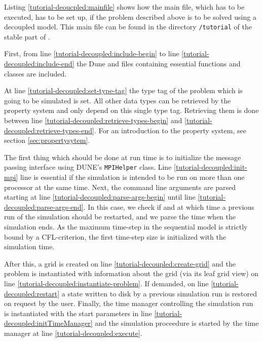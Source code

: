 Listing \ref{tutorial-deoucpled:mainfile} shows how the main file, which has to be executed, has to be set up, if the problem described above is to be solved using a decoupled model. This main file can be found in the directory \texttt{/tutorial} of the stable part of \Dumux.

\begin{lst}\label{tutorial-deoucpled:mainfile} \mbox{}

\end{lst}

First, from line \ref{tutorial-decoupled:include-begin} to line
\ref{tutorial-decoupled:include-end} the Dune and \Dumux files containing
essential functions and classes are included.

At line \ref{tutorial-decoupled:set-type-tag} the type tag of the
problem which is going to be simulated is set. All other data types
can be retrieved by the \Dumux property system and only depend on this
single type tag. Retrieving them is done between line
\ref{tutorial-decoupled:retrieve-types-begin} and
\ref{tutorial-decoupled:retrieve-types-end}. For an introduction to the
property system, see section \ref{sec:propertysytem}.

The first thing which should be done at run time is to initialize the
message passing interface using DUNE's \texttt{MPIHelper} class. Line
\ref{tutorial-decoupled:init-mpi} line is essential if the simulation is
intended to be run on more than one processor at the same time. Next,
the command line arguments are parsed starting at line
\ref{tutorial-decoupled:parse-args-begin} until line
\ref{tutorial-decoupled:parse-args-end}. In this case, we check if and
at which time a previous run of the simulation should be restarted, and we
parse the time when the simulation ends. As the maximum time-step in the 
sequential model is strictly bound by a CFL-criterion, the first time-step
size is initialized with the simulation time.

After this, a grid is created on line \ref{tutorial-decoupled:create-grid} 
and the problem is instantiated with information about the grid
(via its leaf grid view) on line \ref{tutorial-decoupled:instantiate-problem}.
If demanded, on line \ref{tutorial-decoupled:restart} a state written to
disk by a previous simulation run is restored on request by the user.
Finally, the time manager controlling the simulation run is instantiated 
with the start parameters in line \ref{tutorial-decoupled:initTimeManager}
and the simulation proceedure is started by the time manager at line
\ref{tutorial-decoupled:execute}.



